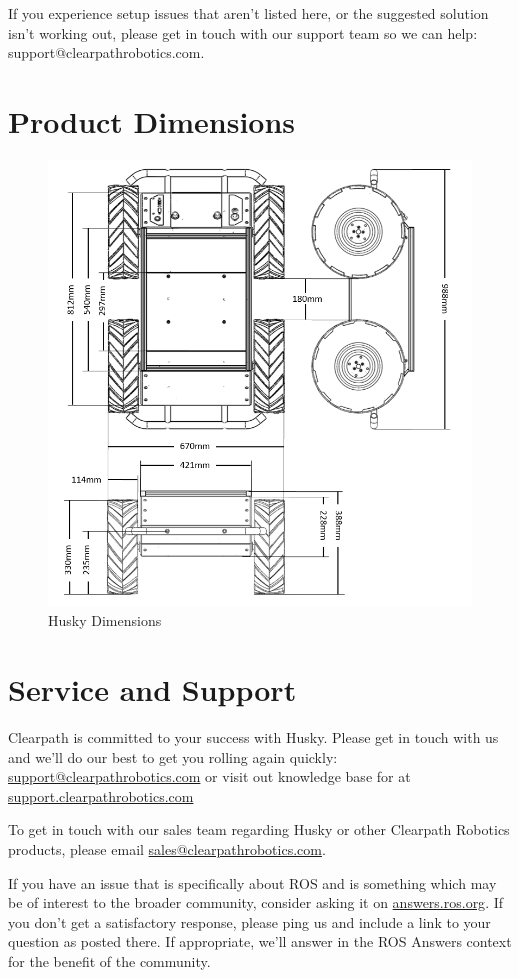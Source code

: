 \documentclass[]{clearpath-latex/clearpath-manual}
\begin{document}
If you experience setup issues that aren’t listed here, or the suggested solution isn’t working out, please get in touch with our support team so we can help: support@clearpathrobotics.com.

\newpage
\section{Product Dimensions}

\begin{figure}[h]
	\centering
	\includegraphics[width=.9\textwidth]{husky-dimensions.png}
	\caption{Husky Dimensions}
\end{figure}
\newpage
\section{Service and Support}
Clearpath is committed to your success with Husky. Please get in touch with us and we'll
do our best to get you rolling again quickly: \href{mailto:support@clearpathrobotics.com}{support@clearpathrobotics.com}
or visit out knowledge base for at \href{http://support.clearpathrobotics.com}{support.clearpathrobotics.com}

To get in touch with our sales team regarding Husky or other Clearpath Robotics products, please
email \href{mailto:sales@clearpathrobotics.com}{sales@clearpathrobotics.com}.

If you have an issue that is specifically about ROS and is something which may be of interest
to the broader community, consider asking it on \href{http://answers.ros.org}{answers.ros.org}.
If you don't get a satisfactory response, please ping us and include a link to your question
as posted there. If appropriate, we'll answer in the ROS Answers context for the benefit of the
community.
\end{document}
